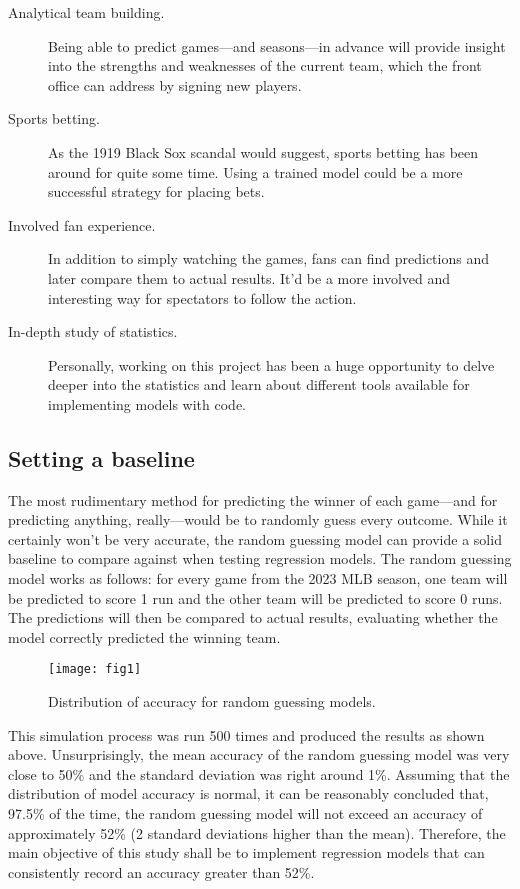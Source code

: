 \documentclass{paper}
\begin{document}
\begin{description}
\item[Analytical team building.] Being able to predict games---and seasons---in advance will provide insight into the strengths and weaknesses of the current team, which the front office can address by signing new players.
\item[Sports betting.] As the 1919 Black Sox scandal would suggest, sports betting has been around for quite some time. Using a trained model could be a more successful strategy for placing bets.
\item[Involved fan experience.] In addition to simply watching the games, fans can find predictions and later compare them to actual results. It'd be a more involved and interesting way for spectators to follow the action.
\item[In-depth study of statistics.] Personally, working on this project has been a huge opportunity to delve deeper into the statistics and learn about different tools available for implementing models with code.
\end{description}

\subsection{Setting a baseline}
The most rudimentary method for predicting the winner of each game---and for predicting anything, really---would be to randomly guess every outcome. While it certainly won't be very accurate, the random guessing model can provide a solid baseline to compare against when testing regression models. The random guessing model works as follows: for every game from the 2023 MLB season, one team will be predicted to score 1 run and the other team will be predicted to score 0 runs. The predictions will then be compared to actual results, evaluating whether the model correctly predicted the winning team.

\begin{figure}[H]
  \centering
  \texttt{[image: fig1]}
  \caption{Distribution of accuracy for random guessing models.}
\end{figure}

This simulation process was run 500 times and produced the results as shown above. Unsurprisingly, the mean accuracy of the random guessing model was very close to 50\% and the standard deviation was right around 1\%. Assuming that the distribution of model accuracy is normal, it can be reasonably concluded that, 97.5\% of the time, the random guessing model will not exceed an accuracy of approximately 52\% (2 standard deviations higher than the mean). Therefore, the main objective of this study shall be to implement regression models that can consistently record an accuracy greater than 52\%.
\end{document}
